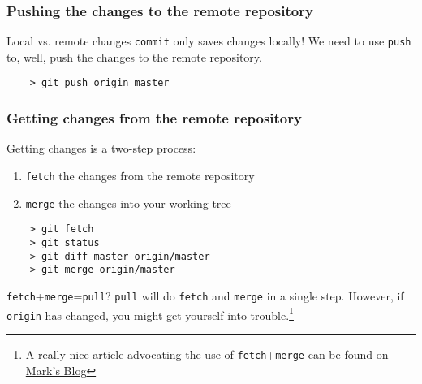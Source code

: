 
\begin{frame}[fragile]
	\frametitle{Pushing the changes to the remote repository}
	
	\begin{block}{Local vs. remote changes}
	\texttt{commit} only saves changes \alert{locally}! We need to use \texttt{push} to, well, push the changes to the remote repository. 
	\end{block}
	
	\begin{verbatim}
	> git push origin master
	\end{verbatim}
	
\end{frame}



\begin{frame}[fragile]
	\frametitle{Getting changes from the remote repository}
	
	Getting changes is a two-step process:
	\begin{enumerate}
		\item \texttt{fetch} the changes from the remote repository
		\item \texttt{merge} the changes into your working tree
	\end{enumerate}
	
	\begin{verbatim}
	> git fetch
	> git status
	> git diff master origin/master
	> git merge origin/master
	\end{verbatim}
	
	\begin{block}{\texttt{fetch}+\texttt{merge}=\texttt{pull}?}
	\texttt{pull} will do \texttt{fetch} and \texttt{merge} in a single step. However, if \texttt{origin} has changed, you might get yourself into trouble.\footnote{A really nice article advocating the use of \texttt{fetch}+\texttt{merge} can be found on \href{http://longair.net/blog/2009/04/16/git-fetch-and-merge/}{Mark's Blog}} 
	\end{block}
\end{frame}


